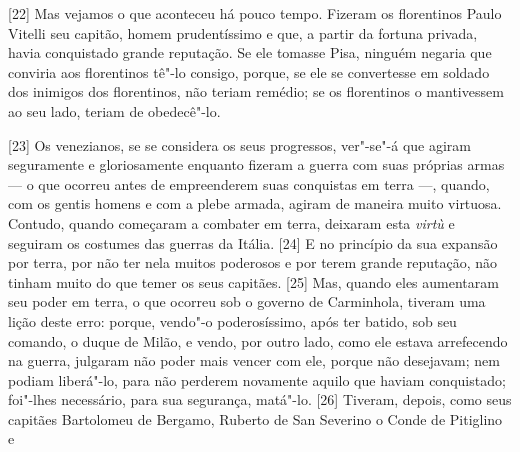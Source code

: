 {[}22{]}
Mas vejamos o que aconteceu há pouco tempo. Fizeram os florentinos Paulo
Vitelli seu capitão, homem
prudentíssimo e que, a partir da fortuna privada, havia conquistado
grande reputação. Se ele tomasse Pisa, ninguém negaria que conviria aos
florentinos tê"-lo consigo, porque, se ele se convertesse em soldado dos
inimigos dos florentinos, não teriam remédio; se os florentinos o
mantivessem ao seu lado, teriam de obedecê"-lo.

{[}23{]} Os venezianos, se se considera os seus progressos, ver"-se"-á que
agiram seguramente e gloriosamente enquanto fizeram a guerra com suas
próprias armas --- o que ocorreu antes de empreenderem suas conquistas em
terra ---, quando, com os gentis homens e com a plebe armada, agiram de
maneira muito virtuosa. Contudo, quando começaram a combater em terra,
deixaram esta \emph{virtù} e seguiram os costumes das guerras da
Itália. {[}24{]} E no princípio da sua expansão por
terra, por não ter nela muitos poderosos e por terem grande reputação,
não tinham muito do que temer os seus capitães. {[}25{]} Mas, quando
eles aumentaram seu poder em terra, o que ocorreu sob o governo de
Carminhola, tiveram uma lição deste erro:
porque, vendo"-o poderosíssimo, após ter batido, sob seu comando, o duque
de Milão, e vendo, por outro lado, como ele estava arrefecendo na
guerra, julgaram não poder mais vencer com ele, porque não desejavam;
nem podiam liberá"-lo, para não perderem novamente aquilo que haviam
conquistado; foi"-lhes necessário, para sua segurança, matá"-lo. {[}26{]}
Tiveram, depois, como seus capitães Bartolomeu de Bergamo, Ruberto de
San Severino o Conde de
Pitiglino e
